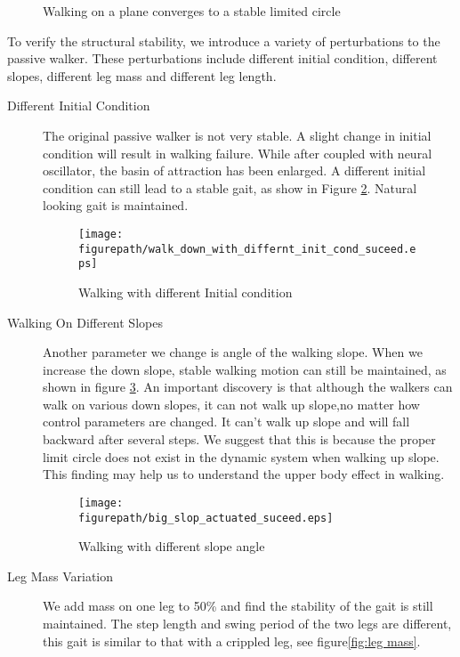 \begin{figure}[!h]
\centerline{
\hfill
{}
}
\caption{
Walking on a plane converges to a stable limited circle
}
\label{fig:walk_on_plane}
\end{figure}
To verify the structural stability, we introduce a variety of perturbations to the passive walker. 
These perturbations include different initial condition, different slopes, different leg mass and different leg length.
\begin{description}
\item [Different Initial Condition]
The original passive walker is not very stable. 
A slight change in initial condition will result in walking failure. 
While after coupled with neural oscillator, the basin of attraction has been enlarged. 
A different initial condition can still lead to a stable gait, as show in Figure \ref{fig:diff_init}. 
Natural looking gait is maintained.
\begin{figure}[h]
\centering
\texttt{[image: \\figurepath/walk\_down\_with\_differnt\_init\_cond\_suceed.eps]}
\caption
{
Walking with different Initial condition
}
\label{fig:diff_init}
\end{figure}
 

\item[Walking On Different Slopes]
Another parameter we change is angle of the walking slope. 
When we increase the down slope, stable walking motion can still be maintained, as shown in figure \ref{fig:diff_slop}.
An important discovery is that although the walkers can walk on various down slopes, it can not walk up slope,no matter how control parameters are changed.
It can’t walk up slope and will fall backward after several steps. 
We suggest that this is because the proper limit circle does not exist in the dynamic system when walking up slope.
This finding may help us to understand the upper body effect in walking.

\begin{figure}[here]
\centering
\texttt{[image: \\figurepath/big\_slop\_actuated\_suceed.eps]}
\caption
{
Walking with different slope angle
}
\label{fig:diff_slop}
\end{figure}

\item[Leg Mass Variation]
We add mass on one leg to 50\% and find the stability of the gait is still maintained. 
The step length and swing period of the two legs are different, this gait is similar to that with a crippled leg, see figure\ref{fig:leg mass}.


\end{description}
